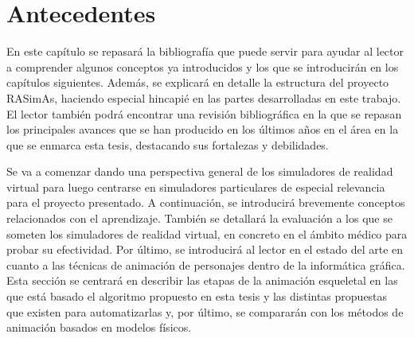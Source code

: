 \chapter{Antecedentes} 
\label{cap:related}


En este capítulo se repasará la bibliografía que puede servir para ayudar al lector a comprender algunos conceptos ya introducidos y los que se introducirán en los capítulos siguientes. 
Además, se explicará en detalle la estructura del proyecto RASimAs, haciendo especial hincapié en las partes desarrolladas en este trabajo. El lector también podrá encontrar una revisión bibliográfica en la que se repasan los principales avances que se han producido en los últimos años en el área en la que se enmarca esta tesis, destacando sus fortalezas y debilidades. 

Se va a comenzar dando una perspectiva general de los simuladores de realidad virtual para luego centrarse en simuladores particulares de especial relevancia para el proyecto presentado. A continuación, se introducirá brevemente conceptos relacionados con el aprendizaje. También se detallará la evaluación a los que se someten los simuladores de realidad virtual, en concreto en el ámbito médico para probar su efectividad. 
Por último, se introducirá al lector en el estado del arte en cuanto a las técnicas de animación de personajes dentro de la informática gráfica. Esta sección se centrará en describir las etapas de la animación esqueletal en las que está basado el algoritmo propuesto en esta tesis y las distintas propuestas que existen para automatizarlas y, por último, se compararán con los métodos de animación basados en modelos físicos.


